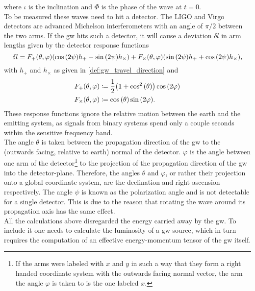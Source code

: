 where $\iota$ is the inclination and $\Phi$ is the phase of the wave at $t=0$.\medskip\\
To be measured these waves need to hit a detector. The LIGO and Virgo detectors are advanced Michelson interferometers with an angle of $\pi/2$ between the two arms. If the \gls{gw} hits such a detector, it will cause a deviation $\delta l$ in arm lengths given by the detector response functions
\begin{equation}\label{def:detector_response}
\delta l = F_+{\left( \theta, \varphi \right)}{\left( \cos{\left( 2\psi \right)}h_+ - \sin{\left( 2\psi \right)} h_\times \right)} + F_\times{\left( \theta, \varphi \right)}{\left( \sin{\left( 2\psi \right)}h_+ + \cos{\left( 2\psi \right)} h_\times \right)},
\end{equation}
with $h_+$ and $h_\times$ as given in \eqref{def:gw_travel_direction} and
\begin{align}
F_+{\left( \theta, \varphi \right)} &\coloneqq \frac{1}{2}{\left( 1+\cos^2{\left( \theta \right)} \right)}\cos{\left( 2\varphi \right)}\nonumber\\
F_\times{\left( \theta, \varphi \right)} &\coloneqq\cos{\left( \theta \right)}\sin{\left( 2\varphi \right)}.
\end{align}
These response functions ignore the relative motion between the earth and the emitting system, as signals from binary systems spend only a couple seconds within the sensitive frequency band. \cite{gw170817}\\
The angle $\theta$ is taken between the propagation direction of the \gls{gw} to the (outwards facing, relative to earth) normal of the detector. $\varphi$ is the angle between one arm of the detector\footnote{If the arms were labeled with $x$ and $y$ in such a way that they form a right handed coordinate system with the outwards facing normal vector, the arm the angle $\varphi$ is taken to is the one labeled $x$.} to the projection of the propagation direction of the \gls{gw} into the detector-plane. Therefore, the angles $\theta$ and $\varphi$, or rather their projection onto a global coordinate system, are the declination and right ascension respectively. The angle $\psi$ is known as the polarization angle and is not detectable for a single detector. This is due to the reason that rotating the wave around its propagation axis has the same effect.\medskip\\
All the calculations above disregarded the energy carried away by the \gls{gw}. To include it one needs to calculate the luminosity of a \gls{gw}-source, which in turn requires the computation of an effective energy-momentum tensor of the \gls{gw} itself.\\

